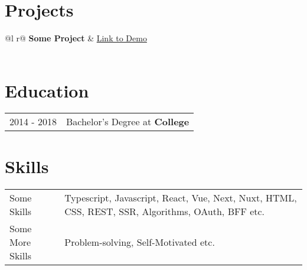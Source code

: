 \documentclass[a4paper,12pt]{article}
\begin{document}
\section{Projects}

\begin{tabularx}{\linewidth}{ @{}l r@{} }
\textbf{Some Project} & \hfill \href{https://some-link.com}{Link to Demo} \\[3.75pt]
  \\
\end{tabularx}

\section{Education}
\begin{tabularx}{\linewidth}{@{}l X@{}}	
2014 - 2018 & Bachelor’s Degree at \textbf{College} \hfill \normalsize  \\
\end{tabularx}

\section{Skills}
\begin{tabularx}{\linewidth}{@{}l X@{}}
Some Skills &  \normalsize{Typescript, Javascript, React, Vue, Next, Nuxt, HTML, CSS, REST, SSR, Algorithms, OAuth, BFF etc.}\\
Some More Skills  &  \normalsize{Problem-solving, Self-Motivated etc.}\\  
\end{tabularx}

\vfill
{}
\end{document}

